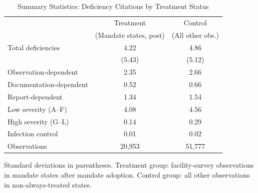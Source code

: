 \begin{table}[htbp]
\centering
\caption{Summary Statistics: Deficiency Citations by Treatment Status}
\label{tab:summary}
\begin{tabular}{lcc}
\toprule
 & Treatment & Control \\
 & (Mandate states, post) & (All other obs.) \\
\midrule
Total deficiencies & 4.22 & 4.86 \\
 & (5.43) & (5.12) \\
Observation-dependent & 2.35 & 2.66 \\
Documentation-dependent & 0.52 & 0.66 \\
Report-dependent & 1.34 & 1.54 \\
Low severity (A--F) & 4.08 & 4.56 \\
High severity (G--L) & 0.14 & 0.29 \\
Infection control & 0.01 & 0.02 \\
\midrule
Observations & 20,953 & 51,777 \\
\bottomrule
\end{tabular}
\begin{flushleft}\small
Standard deviations in parentheses. Treatment group: facility-survey observations in mandate states after mandate adoption. Control group: all other observations in non-always-treated states.
\end{flushleft}
\end{table}
